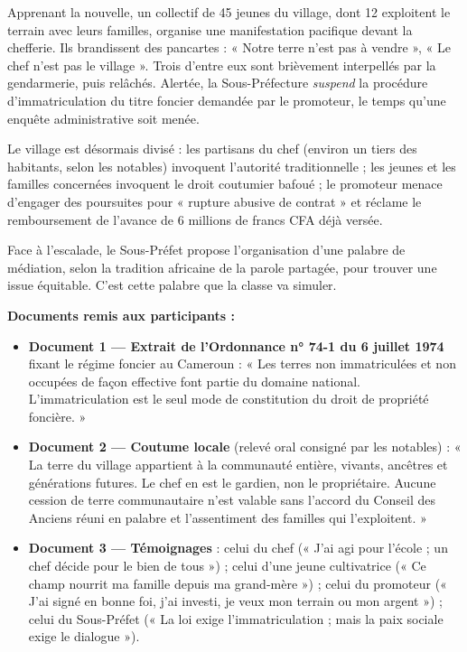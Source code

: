 \documentclass[11pt]{article}
\newcommand{\cle}[1]{{\popxbold\color{popdark}#1}}
\begin{document}
Apprenant la nouvelle, un collectif de 45 jeunes du village, dont 12 exploitent le terrain avec leurs familles, organise une manifestation pacifique devant la chefferie. Ils brandissent des pancartes : « Notre terre n'est pas à vendre », « Le chef n'est pas le village ». Trois d'entre eux sont brièvement interpellés par la gendarmerie, puis relâchés. Alertée, la Sous-Préfecture \emph{suspend} la procédure d'immatriculation du titre foncier demandée par le promoteur, le temps qu'une enquête administrative soit menée.

Le village est désormais divisé : les partisans du chef (environ un tiers des habitants, selon les notables) invoquent l'autorité traditionnelle ; les jeunes et les familles concernées invoquent le droit coutumier bafoué ; le promoteur menace d'engager des poursuites pour « rupture abusive de contrat » et réclame le remboursement de l'avance de 6 millions de francs CFA déjà versée.

Face à l'escalade, le Sous-Préfet propose l'organisation d'une \cle{palabre} de médiation, selon la tradition africaine de la parole partagée, pour trouver une issue équitable. C'est cette palabre que la classe va simuler.

\textbf{Documents remis aux participants :}

\begin{itemize}
\item \textbf{Document 1 — Extrait de l'Ordonnance n° 74-1 du 6 juillet 1974} fixant le régime foncier au Cameroun : « Les terres non immatriculées et non occupées de façon effective font partie du domaine national. L'immatriculation est le seul mode de constitution du droit de propriété foncière. »
\item \textbf{Document 2 — Coutume locale} (relevé oral consigné par les notables) : « La terre du village appartient à la communauté entière, vivants, ancêtres et générations futures. Le chef en est le gardien, non le propriétaire. Aucune cession de terre communautaire n'est valable sans l'accord du Conseil des Anciens réuni en palabre et l'assentiment des familles qui l'exploitent. »
\item \textbf{Document 3 — Témoignages} : celui du chef (« J'ai agi pour l'école ; un chef décide pour le bien de tous ») ; celui d'une jeune cultivatrice (« Ce champ nourrit ma famille depuis ma grand-mère ») ; celui du promoteur (« J'ai signé en bonne foi, j'ai investi, je veux mon terrain ou mon argent ») ; celui du Sous-Préfet (« La loi exige l'immatriculation ; mais la paix sociale exige le dialogue »).
\end{itemize}
\end{document}
